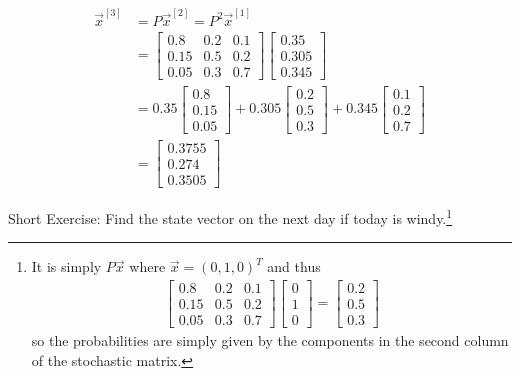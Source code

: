 \begin{solution}
\begin{align*}
\vec{x}^{[3]} &= P\vec{x}^{[2]} = P^2\vec{x}^{[1]} \\
&=
\begin{bmatrix}
0.8 & 0.2 & 0.1\\
0.15 & 0.5 & 0.2 \\
0.05 & 0.3 & 0.7
\end{bmatrix}   
\begin{bmatrix}
0.35 \\
0.305 \\
0.345
\end{bmatrix} \\
&= 0.35
\begin{bmatrix}
0.8 \\
0.15 \\
0.05
\end{bmatrix}
+ 0.305
\begin{bmatrix}
0.2 \\
0.5 \\
0.3
\end{bmatrix}
+ 0.345
\begin{bmatrix}
0.1 \\
0.2 \\
0.7
\end{bmatrix} \\
&=
\begin{bmatrix}
0.3755\\ 
0.274\\
0.3505
\end{bmatrix}
\end{align*}
\end{solution}
Short Exercise: Find the state vector on the next day if today is windy.\footnote{It is simply $P\vec{x}$ where $\vec{x} = (0,1,0)^T$ and thus
\begin{align*}
\begin{bmatrix}
0.8 & 0.2 & 0.1\\
0.15 & 0.5 & 0.2 \\
0.05 & 0.3 & 0.7
\end{bmatrix}  
\begin{bmatrix}
0 \\
1 \\
0
\end{bmatrix}
=
\begin{bmatrix}
0.2 \\
0.5 \\
0.3
\end{bmatrix}
\end{align*} so the probabilities are simply given by the components in the second column of the stochastic matrix.}


